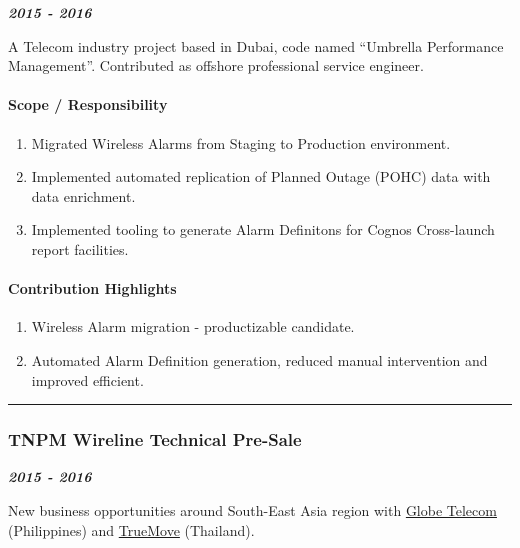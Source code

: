 \documentclass[
]{article}
\providecommand{\tightlist}{%
  \setlength{\itemsep}{0pt}\setlength{\parskip}{0pt}}
\begin{document}
\textbf{\emph{2015 - 2016}}

A Telecom industry project based in Dubai, code named ``Umbrella
Performance Management''. Contributed as offshore professional service
engineer.

\hypertarget{scope-responsibility-8}{%
\paragraph{Scope / Responsibility}\label{scope-responsibility-8}}

\begin{enumerate}
\def\labelenumi{\arabic{enumi}.}
\tightlist
\item
  Migrated Wireless Alarms from Staging to Production environment.
\item
  Implemented automated replication of Planned Outage (POHC) data with
  data enrichment.
\item
  Implemented tooling to generate Alarm Definitons for Cognos
  Cross-launch report facilities.
\end{enumerate}

\hypertarget{contribution-highlights-8}{%
\paragraph{Contribution Highlights}\label{contribution-highlights-8}}

\begin{enumerate}
\def\labelenumi{\arabic{enumi}.}
\tightlist
\item
  Wireless Alarm migration - productizable candidate.
\item
  Automated Alarm Definition generation, reduced manual intervention and
  improved efficient.
\end{enumerate}

\begin{center}\rule{0.5\linewidth}{0.5pt}\end{center}

\hypertarget{tnpm-wireline-technical-pre-sale}{%
\subsubsection{TNPM Wireline Technical
Pre-Sale}\label{tnpm-wireline-technical-pre-sale}}

\textbf{\emph{2015 - 2016}}

New business opportunities around South-East Asia region with
\href{https://www.globe.com.ph/}{Globe Telecom} (Philippines) and
\href{http://truemoveh.truecorp.co.th/?ln=en}{TrueMove} (Thailand).
\end{document}

